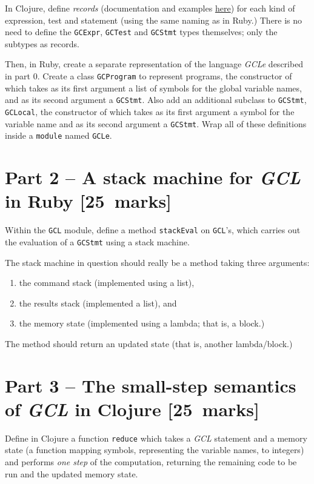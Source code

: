\documentclass[11pt]{article}
\theoremstyle{definition}
\begin{document}
In Clojure, define \emph{records} (documentation and examples
\href{https://clojuredocs.org/clojure.core/defrecord}{here}) for each kind of expression, test and statement
(using the same naming as in Ruby.)
There is no need to define the \texttt{GCExpr}, \texttt{GCTest} and \texttt{GCStmt} types themselves;
only the subtypes as records.

Then, in Ruby, create a separate representation of
the language \emph{GCLe} described in part 0.
Create a class \texttt{GCProgram} to represent programs,
the constructor of which takes as its first argument
a list of symbols for the global variable names,
and as its second argument a \texttt{GCStmt}.
Also add an additional subclass to \texttt{GCStmt}, \texttt{GCLocal},
the constructor of which takes as its first argument a symbol
for the variable name and as its second argument a \texttt{GCStmt}.
Wrap all of these definitions inside a \texttt{module} named \texttt{GCLe}.

\section*{Part 2 – A stack machine for \emph{GCL} in Ruby              [25 marks]}
\label{sec:org9124665}
Within the \texttt{GCL} module, define a method \texttt{stackEval} on \texttt{GCL}'s,
which carries out the evaluation of a \texttt{GCStmt} using a stack machine.

The stack machine in question should really be a method
taking three arguments:
\begin{enumerate}
\item the command stack (implemented using a list),
\item the results stack (implemented a list), and
\item the memory state (implemented using a lambda; that is, a block.)
\end{enumerate}

The method should return an updated state
(that is, another lambda/block.)

\section*{Part 3 – The small-step semantics of \emph{GCL} in Clojure   [25 marks]}
\label{sec:org5e4f5d5}
Define in Clojure a function \texttt{reduce} which takes
a \emph{GCL} statement and a memory state
(a function mapping symbols, representing the variable names, to integers)
and performs \emph{one step} of the computation, returning the
remaining code to be run and the updated memory state.
\end{document}
